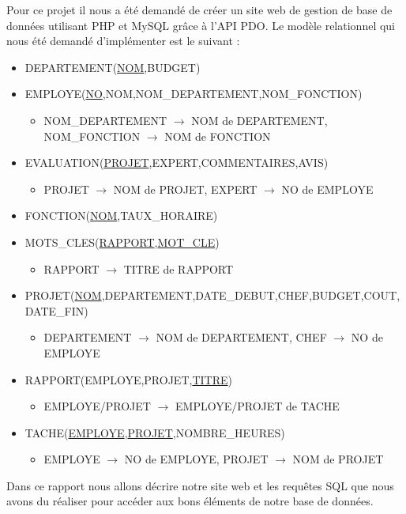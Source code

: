 Pour ce projet il nous a été demandé de créer un site web de gestion de base de données utilisant 
PHP et MySQL grâce à l'API PDO. Le modèle relationnel qui nous été demandé d'implémenter est le suivant :
\\
\begin{itemize}
  \item DEPARTEMENT(\underline{NOM},BUDGET)
  \item EMPLOYE(\underline{NO},NOM,NOM\_DEPARTEMENT,NOM\_FONCTION)
  \begin{itemize}
    \item NOM\_DEPARTEMENT $\rightarrow$ NOM de DEPARTEMENT, NOM\_FONCTION $\rightarrow$ NOM de FONCTION
  \end{itemize}
  \item EVALUATION(\underline{PROJET},EXPERT,COMMENTAIRES,AVIS)
  \begin{itemize}
    \item PROJET $\rightarrow$ NOM de PROJET, EXPERT $\rightarrow$ NO de EMPLOYE
  \end{itemize}
  \item FONCTION(\underline{NOM},TAUX\_HORAIRE)
  \item MOTS\_CLES(\underline{RAPPORT},\underline{MOT\_CLE})
  \begin{itemize}
    \item RAPPORT $\rightarrow$ TITRE de RAPPORT
  \end{itemize}
  \item PROJET(\underline{NOM},DEPARTEMENT,DATE\_DEBUT,CHEF,BUDGET,COUT,DATE\_FIN)
  \begin{itemize}
    \item DEPARTEMENT $\rightarrow$ NOM de DEPARTEMENT, CHEF $\rightarrow$ NO de EMPLOYE
  \end{itemize}
  \item RAPPORT(EMPLOYE,PROJET,\underline{TITRE})
  \begin{itemize}
    \item EMPLOYE/PROJET $\rightarrow$ EMPLOYE/PROJET de TACHE
  \end{itemize}
  \item TACHE(\underline{EMPLOYE},\underline{PROJET},NOMBRE\_HEURES)
  \begin{itemize}
    \item EMPLOYE $\rightarrow$ NO de EMPLOYE, PROJET $\rightarrow$ NOM de PROJET
  \end{itemize}
\end{itemize}
Dans ce rapport nous allons décrire notre site web et les requêtes SQL que nous avons du réaliser pour accéder aux bons éléments de notre base de données.


